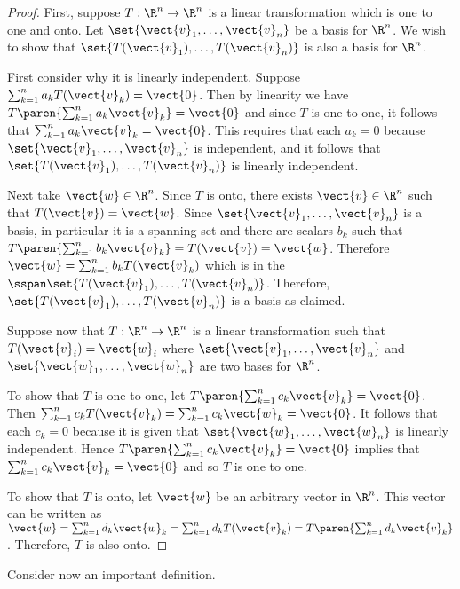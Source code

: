\begin{proof}
First, suppose $T:\R^n \to \R^n$ is a linear
transformation which is one to one and onto. Let $\set{
\vect{v}_{1},\ldots,\vect{v}_{n}} $ be a basis for
$\R^n$. We wish to show that $\set{T(\vect{v}_{1}),\ldots,
T(\vect{v}_{n})} $ is also a basis for $\R^n$.

First consider why it is linearly independent. Suppose
$\sum_{k=1}^{n}a_{k}T(\vect{v}_{k})=\vect{0}$. Then by linearity we have $T\paren{
\sum_{k=1}^{n}a_{k}\vect{v}_{k}} =\vect{0}$ and since $T$ is one
to one, it follows that $\sum_{k=1}^{n}a_{k}\vect{v}_{k}=\vect{0}$.
This requires that  each $a_{k}=0$ because $\set{\vect{v}_{1},\ldots,
\vect{v}_{n}} $ is independent, and it follows that $\set{
T(\vect{v}_{1}),\ldots, T(\vect{v}_{n})} $ is linearly
independent.


Next take $\vect{w}\in \R^n$. Since $T$ is onto, there exists
$\vect{v}\in \R^n$ such that $T(\vect{v})=\vect{w}$. Since
$ \set{\vect{v}_{1},\ldots,\vect{v}_{n}}$ is a basis, in particular it
is a spanning set and there are scalars $b_{k}$ such that
$T\paren{\sum_{k=1}^{n}b_{k}\vect{v} _{k}} =T(\vect{v})
=\vect{w}$. Therefore $\vect{w} =\sum_{k=1}^{n}b_{k}T(\vect{v}_{k})$
which is in the
$\sspan\set{T(\vect{v}_{1}),\ldots,T(\vect{v}_{n})}$. Therefore,
$\set{T(\vect{v}_{1}),\ldots,T(\vect{v}_{n})}$ is a basis as
claimed.

Suppose now that $T: \R^n \to \R^n$ is a linear
transformation such that $T(\vect{v}_{i})=\vect{w}_{i}$ where
$\set{\vect{v} _{1},\ldots,\vect{v}_{n}} $ and $\set{
\vect{w}_{1},\ldots, \vect{w}_{n}} $ are two bases for
$\R^n$.

To show that $T$ is one to one, let $T\paren{
\sum_{k=1}^{n}c_{k}\vect{v}_{k}} =\vect{0}$. Then
$\sum_{k=1}^{n}c_{k}T(\vect{v}_{k})=\sum_{k=1}^{n}c_{k}\vect{w}_{k}=\vect{
0}$. It follows that each $c_{k} = 0$ because it is given that
$\set{\vect{w} _{1},\ldots,\vect{w}_{n}} $ is linearly
independent. Hence $T\paren{\sum_{k=1}^{n}c_{k}\vect{v}_{k}}
=\vect{0}$ implies that $\sum_{k=1}^{n}c_{k}\vect{v}_{k}=\vect{0}$ and
so $T$ is one to one.

To show that $T$ is onto, let $\vect{w}$ be an arbitrary vector in
$\R^n$. This vector can be written as $\vect{w} =
\sum_{k=1}^{n}d_k\vect{w}_k =
\sum_{k=1}^{n}d_{k}T(\vect{v}_{k})=T\paren{\sum_{k=1}^{n}d_{k}
\vect{v}_{k}}$.  Therefore, $T$ is also onto.
\end{proof}

Consider now an important definition.

